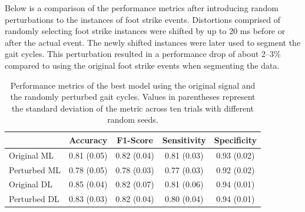 \documentclass[sensors,article,accept,pdftex,moreauthors]{Definitions/mdpi}
\begin{document}
{Below is a comparison of the performance metrics after introducing random perturbations to the instances of foot strike events. Distortions comprised of randomly selecting foot strike instances were shifted by up to 20 ms before or after the actual event. The newly shifted instances were later used to segment the gait cycles.
This perturbation resulted in a performance drop of about 2--3\% compared to using the original foot strike events when segmenting the data.}
\begin{table}[H]
\caption{Performance metrics of the best model using the original signal and the randomly perturbed gait cycles. Values in parentheses represent the standard deviation of the metric across ten trials with different random seeds.}
\setlength{\tabcolsep}{3.35mm}
\begin{tabular}{lcccc}
\toprule
\hl{Signal and Model Type


}
& Accuracy & F1-Score & Sensitivity & Specificity \\
\midrule
Original ML & 0.81 (0.05) & 0.82 (0.04) & 0.81 (0.03) & 0.93 (0.02) \\
Perturbed ML & 0.78 (0.05) & 0.78 (0.03) & 0.77 (0.03) & 0.92 (0.02) \\
\midrule
Original DL    & 0.85 (0.04) & 0.82 (0.07) & 0.81 (0.06) & 0.94 (0.01) \\
Perturbed DL    & 0.83 (0.03) & 0.82 (0.04) & 0.80 (0.04) & 0.94 (0.01) \\
\bottomrule
\end{tabular}


\label{tab:perturbation_analysis}
\end{table}
\end{document}
